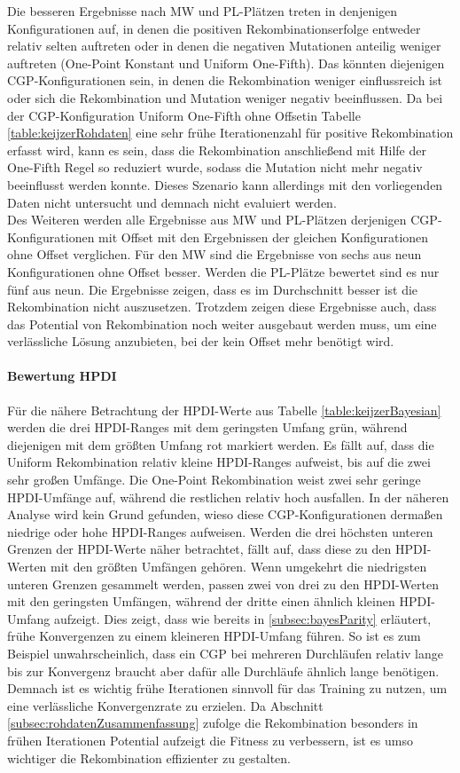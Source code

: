 Die besseren Ergebnisse nach MW und PL-Plätzen treten in denjenigen Konfigurationen auf, in denen die positiven Rekombinationserfolge entweder relativ selten auftreten oder in denen die negativen Mutationen anteilig weniger auftreten (One-Point Konstant und Uniform One-Fifth).
Das könnten diejenigen CGP-Konfigurationen sein, in denen die Rekombination weniger einflussreich ist oder sich die Rekombination und Mutation weniger negativ beeinflussen.
Da bei der CGP-Konfiguration \glqq Uniform One-Fifth ohne Offset\grqq\space in Tabelle \ref{table:keijzerRohdaten} eine sehr frühe Iterationenzahl für positive Rekombination erfasst wird, kann es sein, dass die Rekombination anschließend mit Hilfe der One-Fifth Regel so reduziert wurde, sodass die Mutation nicht mehr negativ beeinflusst werden konnte.
Dieses Szenario kann allerdings mit den vorliegenden Daten nicht untersucht und demnach nicht evaluiert werden.\\
Des Weiteren werden alle Ergebnisse aus MW und PL-Plätzen derjenigen CGP-Kon\-fi\-gu\-ra\-tionen mit Offset mit den Ergebnissen der gleichen Konfigurationen ohne Offset verglichen.
Für den MW sind die Ergebnisse von sechs aus neun Konfigurationen ohne Offset besser.
Werden die PL-Plätze bewertet sind es nur fünf aus neun.
Die Ergebnisse zeigen, dass es im Durchschnitt besser ist die Rekombination nicht auszusetzen.
Trotzdem zeigen diese Ergebnisse auch, dass das Potential von Rekombination noch weiter ausgebaut werden muss, um eine verlässliche Lösung anzubieten, bei der kein Offset mehr benötigt wird.
\paragraph{Bewertung HPDI}
Für die nähere Betrachtung der HPDI-Werte aus Tabelle \ref{table:keijzerBayesian} werden die drei HPDI-Ranges mit dem geringsten Umfang grün, während diejenigen mit dem größten Umfang rot markiert werden.
Es fällt auf, dass die Uniform Rekombination relativ kleine HPDI-Ranges aufweist, bis auf die zwei sehr großen Umfänge.
Die One-Point Rekombination weist zwei sehr geringe HPDI-Umfänge auf, während die restlichen relativ hoch ausfallen.
In der näheren Analyse wird kein Grund gefunden, wieso diese CGP-Konfigurationen dermaßen niedrige oder hohe HPDI-Ranges aufweisen. 
Werden die drei höchsten unteren Grenzen der HPDI-Werte näher betrachtet, fällt auf, dass diese zu den HPDI-Werten mit den größten Umfängen gehören.
Wenn umgekehrt die niedrigsten unteren Grenzen gesammelt werden, passen zwei von drei zu den HPDI-Werten mit den geringsten Umfängen, während der dritte einen ähnlich kleinen HPDI-Umfang aufzeigt.
Dies zeigt, dass wie bereits in \ref{subsec:bayesParity} erläutert, frühe Konvergenzen zu einem kleineren HPDI-Umfang führen.
So ist es zum Beispiel unwahrscheinlich, dass ein CGP bei mehreren Durchläufen relativ lange bis zur Konvergenz braucht aber dafür alle Durchläufe ähnlich lange benötigen.
Demnach ist es wichtig frühe Iterationen sinnvoll für das Training zu nutzen, um eine verlässliche Konvergenzrate zu erzielen.
Da Abschnitt \ref{subsec:rohdatenZusammenfassung} zufolge die Rekombination besonders in frühen Iterationen Potential aufzeigt die Fitness zu verbessern, ist es umso wichtiger die Rekombination effizienter zu gestalten.


